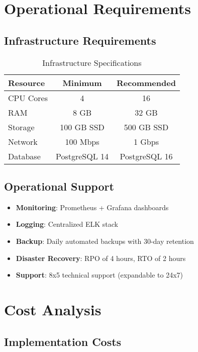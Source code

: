 \documentclass[11pt,a4paper]{article}
\begin{document}
\section{Operational Requirements}

\subsection{Infrastructure Requirements}

\begin{table}[H]
\centering
\begin{tabular}{lcc}
\toprule
\textbf{Resource} & \textbf{Minimum} & \textbf{Recommended} \\
\midrule
CPU Cores & 4 & 16 \\
RAM & 8 GB & 32 GB \\
Storage & 100 GB SSD & 500 GB SSD \\
Network & 100 Mbps & 1 Gbps \\
Database & PostgreSQL 14 & PostgreSQL 16 \\
\bottomrule
\end{tabular}
\caption{Infrastructure Specifications}
\end{table}

\subsection{Operational Support}

\begin{itemize}
    \item \textbf{Monitoring}: Prometheus + Grafana dashboards
    \item \textbf{Logging}: Centralized ELK stack
    \item \textbf{Backup}: Daily automated backups with 30-day retention
    \item \textbf{Disaster Recovery}: RPO of 4 hours, RTO of 2 hours
    \item \textbf{Support}: 8x5 technical support (expandable to 24x7)
\end{itemize}

\section{Cost Analysis}

\subsection{Implementation Costs}
\end{document}
